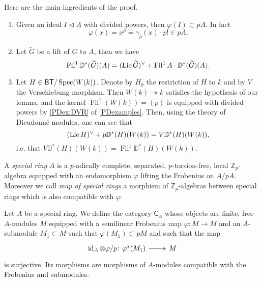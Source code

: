 \begin{rem}[]\label{rem:A2Kisin}
	Here are the main ingredients of the proof.
\begin{enumerate}
	\item Given an ideal $I \triangleleft A$ with divided powers, then $\varphi(I) \subset pA$.
		In fact 
		\begin{equation*}
			\varphi(x) = x^p = \gamma_p(x) \cdot p! \in pA
		.\end{equation*}

	\item Let $\widetilde{G}$ be a lift of $G$ to $A$, then we have
		\begin{equation*}
			\operatorname{Fil}^1\mathbb{D}^*(\widetilde{G})(A) =
			( \operatorname{Lie} \widetilde{G} )^\vee +
			\operatorname{Fil}^1A \cdot \mathbb{D}^*(\widetilde{G})(A)
		.\end{equation*}
		
	\item Let $H \in \mathsf{BT}/\operatorname{Spec}(W(k))$. Denote by $H_0$ the restriction
		of $H$ to $k$ and by $V$ the Verschiebung morphism.
		Then $W(k) \twoheadrightarrow k$ satisfies the hypothesis of our lemma,
		and the kernel $\operatorname{Fil}^1(W(k)) = (p)$ is equipped with divided powers
		by \cref{PDex:DVR} of \cref{PDexamples}.
		Then, using the theory of Dieudonné modules, one can see that
		\begin{equation*}
			( \operatorname{Lie} H)^\vee + p \mathbb{D}^*(H)(W(k)) =
			V \mathbb{D}^{*}(H)(W(k))
		,\end{equation*}
		i.e. that
		$V \mathbb{D}^*(H)(W(k)) = \operatorname{Fil}^1 \mathbb{D}^*(H)(W(k))$.
\end{enumerate}
\end{rem}


\begin{defn}
	A \emph{special ring} $A$ is a $p$-adically complete, separated, $p$-torsion-free,
	local $\mathbb{Z}_{p}$-algebra equipped with an endomorphism $\varphi$
	lifting the Frobenius on $A/pA$.
	Moreover we call \emph{map of special rings} a morphism
	of $\mathbb{Z}_{p}$-algebras between special rings 
	which is also compatible with $\varphi$.
\end{defn}


\begin{defn}[]
	Let $A$ be a special ring. We define the category
	$\mathsf{C}_A$ whose objects are finite, free $A$-modules
	$M$ equipped with a semilinear Frobenius map $\varphi\colon M \to M$
	and an $A$-submodule $M_1 \subset M$ such that $\varphi(M_1) \subset pM$
	and such that the map
	\begin{equation*}
	\begin{tikzcd}[row sep = 0ex
		,/tikz/column 1/.append style={anchor=base east}
		,/tikz/column 2/.append style={anchor=base west}]
		\id_{ A }\otimes\varphi/p\colon 
		\varphi^*(M_1) \arrow[r, "", twoheadrightarrow] &
		M
	\end{tikzcd}
	\end{equation*} 
	is surjective.
	Its morphisms are morphisms of $A$-modules compatible with
	the Frobenius and submodules.
\end{defn}


